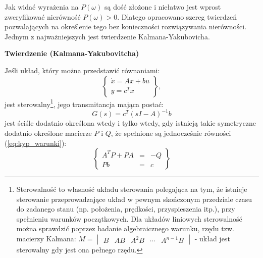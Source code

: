 \documentclass{article}
\begin{document}
        Jak widać wyrażenia na $P(\omega)$ są dość złożone i niełatwo jest wprost zweryfikować nierówność $P(\omega) > 0$.
        Dlatego opracowano szereg twierdzeń pozwalających na określenie tego bez konieczności rozwiązywania nierówności.
        Jednym z najważniejszych jest twierdzenie Kalmana-Yakubovicha.

        
        \textbf{Twierdzenie (Kalmana-Yakubovitcha)}

        Jeśli układ, który można przedstawić równaniami:%
        $$
            \left\{
            \begin{array}{l}
                \dot{x} = Ax + bu\\
                y = c^{T}x
            \end{array}
            \right\},
        $$
        jest sterowalny\footnote{Sterowalność to własność układu sterowania polegająca na tym, że istnieje sterowanie przeprowadzające układ w pewnym skończonym przedziale czasu do zadanego stanu (np. położenia, prędkości, przyspieszenia itp.), przy spełnieniu warunków początkowych. Dla układów liniowych sterowalność można sprawdzić poprzez badanie algebraicznego warunku, rzędu tzw. macierzy Kalmana: $M = \begin{vmatrix}B & AB & A^{2}B & \cdots & A^{n-1}B\end{vmatrix}$ - układ jest sterowalny gdy jest ona pełnego rzędu.}, jego transmitancja mająca postać:
        $$
            G(s) = c^{T}(sI-A)^{-1}b
        $$
        jest ściśle dodatnio określona wtedy i tylko wtedy, gdy istnieją takie symetryczne dodatnio określone macierze $P$ i $Q$, że spełnione są jednocześnie równości (\ref{eq:kyp_warunki}):
        \begin{equation}
            \label{eq:kyp_warunki}
            \left\{
            \begin{array}{rcl}
                A^{T}P + PA & = & -Q\\
                Pb & = &  c
            \end{array}
            \right\}
        \end{equation}
\end{document}
